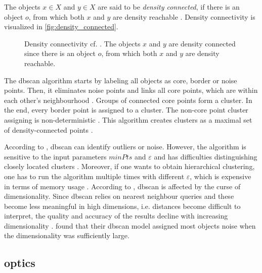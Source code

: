The objects $x \in X$ and $y \in X$ are said to be \textit{density connected}, if there is an object $o$, from which both $x$ and $y$ are density reachable \cite{OPTICS_kMeans_2016}.
Density connectivity is visualized in \autoref{fig:density_connected}.

\begin{figure}[htp] %
    \centering
    
    \caption[Density connectivity]{Density connectivity cf. \cite{OPTICS1999}.
    The objects $x$ and $y$ are density connected since there is an object $o$, from which both $x$ and $y$ are density reachable.
    }
    \label{fig:density_connected}
\end{figure}

The \ac{dbscan} algorithm starts by labeling all objects as core, border or noise points.
Then, it eliminates noise points and links all core points, which are within each other's neighbourhood \cite{OPTICS_kMeans_2016}.
Groups of connected core points form a cluster.
In the end, every border point is assigned to a cluster.
The non-core point cluster assigning is non-deterministic \cite{OPTICS2013}.
This algorithm creates clusters as a maximal set of density-connected points \cite{OPTICS_kMeans_2016}.

According to \citeauthor{OPTICS_kMeans_2016}, \ac{dbscan} can identify outliers or noise.
However, the algorithm is sensitive to the input parameters $minPts$ and $\varepsilon$ and has difficulties distinguishing closely located clusters \cite{OPTICS_kMeans_2016}.
Moreover, if one wants to obtain hierarchical clustering, one has to run the algorithm multiple times with different $\varepsilon$, which is expensive in terms of memory usage \cite{OPTICS2013}.
According to \citeauthor{clusteringDocs2020}, \ac{dbscan} is affected by the curse of dimensionality.
Since \ac{dbscan} relies on nearest neighbour queries and these become less meaningful in high dimensions, i.e. distances become difficult to interpret, 
the quality and accuracy of the results decline with increasing dimensionality \cite{clusteringDocs2020}.
\citeauthor{clusteringDocs2020} found that their \ac{dbscan} model assigned most objects noise when the dimensionality was sufficiently large.


\subsection{\acs*{optics}}\label{subsec:optics}

